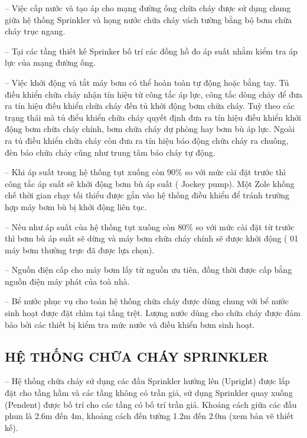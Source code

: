 -- Việc cấp nước và tạo áp cho mạng đường ống chữa cháy được sử dụng chung giữa hệ thống Sprinkler và họng nước chữa cháy vách tường bằng bộ bơm chữa cháy trục ngang.

-- Tại các tầng thiết kế Sprinker bố trí các đồng hồ đo áp suất nhằm kiểm tra áp lực của mạng đường ống.

-- Việc khởi động và tắt máy bơm có thể hoàn toàn tự động hoặc bằng tay. Tủ điều khiển chữa cháy nhận tín hiệu từ công tắc áp lực, công tắc dòng chảy để đưa ra tín hiệu điều khiển chữa cháy đến tủ khởi động bơm chữa cháy. Tuỳ theo các trạng thái mà tủ điểu khiển chữa cháy quyết định đưa ra tín hiệu điều khiển khởi động bơm chữa cháy chính, bơm chữa cháy dự phòng hay bơm bù áp lực. Ngoài ra tủ điều khiển chữa cháy còn đưa ra tín hiệu báo động chữa cháy ra chuông, đèn báo chữa cháy cũng như trung tâm báo cháy tự động.

-- Khi áp suất trong hệ thống tụt xuống còn 90\% so với mức cài đặt trước thì công tắc áp suất sẽ khởi động bơm bù áp suất ( Jockey pump). Một Zole khống chế thời gian chạy tối thiểu được gắn vào hệ thống điều khiển để tránh trường hợp máy bơm bù bị khởi động liên tục.

-- Nếu như áp suất của hệ thống tụt xuống còn 80\% so với mức cài đặt từ trước thì bơm bù áp suất sẽ dừng và máy bơm chữa cháy chính sẽ được khởi động ( 01 máy bơm thường trực đã được lựa chọn).

-- Nguồn điện cấp cho máy bơm lấy từ nguồn ưu tiên, đồng thời được cấp bằng nguồn điện máy phát của toà nhà.

-- Bể nước phục vụ cho toàn hệ thống chữa cháy được dùng chung với bể nước sinh hoạt được đặt chìm tại tầng trệt. Lượng nước dùng cho chữa cháy được đảm bảo bởi các thiết bị kiểm tra mức nước và điều khiển bơm sinh hoạt.

\subsection{HỆ THỐNG CHỮA CHÁY SPRINKLER}
-- Hệ thống chữa cháy sử dụng các đầu Sprinkler hướng lên (Upright) được lắp đặt cho tầng hầm và các tầng không có trần giả, sử dụng Sprinkler quay xuống (Pendent) được bố trí cho các tầng có bố trí trần giả. Khoảng cách giữa các đầu phun là 2.6m đến 4m, khoảng cách đến tường 1.2m đến 2.0m (xem bản vẽ thiết kế).

